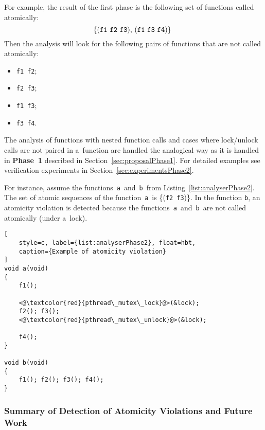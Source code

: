 \begin{example}
    For example, the result of the first phase is the following set of 
    functions called atomically: 
    $$
        \text{%
            \{(\texttt{f1}~\texttt{f2}~\texttt{f3}),
            (\texttt{f1}~\texttt{f3}~\texttt{f4})\}
        }
    $$
    Then the analysis will look
    for the following pairs of functions that are not called atomically:
    \begin{itemize}
        \item \texttt{f1}~\texttt{f2};
        \item \texttt{f2}~\texttt{f3};
        \item \texttt{f1}~\texttt{f3};
        \item \texttt{f3}~\texttt{f4}.
    \end{itemize}
\end{example}

The analysis of functions with nested function calls and cases
where lock/unlock calls are not paired in a~function are handled
the analogical way as it is handled in \textbf{Phase~1} described in
Section~\ref{sec:proposalPhase1}. For detailed examples see verification
experiments in Section~\ref{sec:experimentsPhase2}.

\begin{example}
    For instance, assume the functions~\texttt{a}~and~\texttt{b}~from
    Listing~\ref{list:analyserPhase2}. The set of atomic sequences of the
    function~\texttt{a}~is \{(\texttt{f2}~\texttt{f3})\}. In the function
    \texttt{b}, an atomicity violation is detected because the 
    functions~\texttt{a}~and~\texttt{b}~are not called atomically (under
    a~lock).
\end{example}

\begin{lstlisting}[
    style=c, label={list:analyserPhase2}, float=hbt,
    caption={Example of atomicity violation}
]
void a(void)
{
    f1();

    <@\textcolor{red}{pthread\_mutex\_lock}@>(&lock);
    f2(); f3();
    <@\textcolor{red}{pthread\_mutex\_unlock}@>(&lock);
    
    f4();
}

void b(void)
{
    f1(); f2(); f3(); f4();
}
\end{lstlisting}

\subsubsection{Summary of Detection of Atomicity Violations and Future Work}

